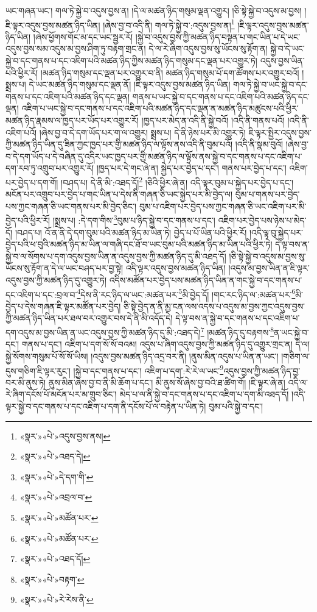 ཡང་གཞན་ཡང་། གལ་ཏེ་སྐྱེ་བ་འདུས་བྱས་ན། །དེ་ལ་མཚན་ཉིད་གསུམ་ལྡན་འགྱུར། །ཅི་སྟེ་སྐྱེ་བ་འདུས་མ་བྱས། །ཇི་ལྟར་འདུས་བྱས་མཚན་ཉིད་ཡིན། །ཞེས་བྱ་བ་འདི་ནི། གལ་ཏེ་སྐྱེ་བ་:འདུས་བྱས་ན།\footnote{«སྣར་»«པེ་»འདུས་བྱས་ནས།} །ཇི་ལྟར་འདུས་བྱས་མཚན་ཉིད་ཡིན། །ཞེས་ཕྱོགས་གོང་མ་དང་ཡང་སྦྱར་རོ། །སྐྱེ་བ་འདུས་བྱས་ཀྱི་མཚན་ཉིད་བསྟན་པ་གང་ཡིན་པ་དེ་ཡང་འདུས་བྱས་སམ་འདུས་མ་བྱས་ཤིག་ཏུ་བརྟག་གྲང་ན། དེ་ལ་རེ་ཞིག་འདུས་བྱས་སུ་ཡོངས་སུ་རྟོག་ན། སྐྱེ་བ་དེ་ཡང་སྐྱེ་བ་དང་གནས་པ་དང་འཇིག་པའི་མཚན་ཉིད་ཀྱིས་མཚན་ཉིད་གསུམ་དང་ལྡན་པར་འགྱུར་ཏེ། འདུས་བྱས་ཡིན་པའི་ཕྱིར་རོ། །མཚན་ཉིད་གསུམ་དང་ལྡན་པར་འགྱུར་བ་ནི། མཚན་ཉིད་གསུམ་པོ་དག་ཚོགས་པར་འགྱུར་བའོ། །སྨྲས་པ། དེ་ཡང་མཚན་ཉིད་གསུམ་དང་ལྡན་ནོ། །ཇི་ལྟར་འདུས་བྱས་མཚན་ཉིད་ཡིན། གལ་ཏེ་སྐྱེ་བ་ཡང་སྐྱེ་བ་དང་གནས་པ་དང་འཇིག་པའི་མཚན་ཉིད་དང་ལྡན། གནས་པ་ཡང་སྐྱེ་བ་དང་གནས་པ་དང་འཇིག་པའི་མཚན་ཉིད་དང་ལྡན། འཇིག་པ་ཡང་སྐྱེ་བ་དང་གནས་པ་དང་འཇིག་པའི་མཚན་ཉིད་དང་ལྡན་ན་མཚན་ཉིད་མཚུངས་པའི་ཕྱིར་མཚན་ཉིད་རྣམས་ལ་ཁྱད་པར་ཡོད་པར་འགྱུར་རོ། །ཁྱད་པར་མེད་ན་འདི་ནི་སྐྱེ་བའོ། །འདི་ནི་གནས་པའོ། །འདི་ནི་འཇིག་པའོ། །ཞེས་བྱ་བ་དེ་དག་ཡོད་པར་ག་ལ་འགྱུར། སྨྲས་པ། དེ་ནི་ཉེས་པར་མི་འགྱུར་ཏེ། ཇི་ལྟར་སྤྱིར་འདུས་བྱས་ཀྱི་མཚན་ཉིད་ཡིན་དུ་ཟིན་ཀྱང་ཁྱད་པར་གྱི་མཚན་ཉིད་ལ་ལྟོས་ནས་འདི་ནི་བུམ་པའོ། །འདི་ནི་སྣམ་བུའོ། །ཞེས་བྱ་བ་དེ་དག་ཡོད་པ་དེ་བཞིན་དུ་འདིར་ཡང་ཁྱད་པར་གྱི་མཚན་ཉིད་ལ་ལྟོས་ནས་སྐྱེ་བ་དང་གནས་པ་དང་འཇིག་པ་དག་རབ་ཏུ་འགྲུབ་པར་འགྱུར་རོ། །ཁྱད་པར་དེ་གང་ཞེ་ན། སྐྱེད་པར་བྱེད་པ་དང་། གནས་པར་བྱེད་པ་དང་། འཇིག་པར་བྱེད་པ་དག་གོ། །བཤད་པ། དེ་ནི་མི་:འཐད་དོ།\footnote{«སྣར་»«པེ་»འཐད་དེ།} །ཅིའི་ཕྱིར་ཞེ་ན། འདི་ལྟར་བུམ་པ་སྐྱེད་པར་བྱེད་པ་དང་། མངོན་པར་འགྲུབ་པར་བྱེད་པ་གང་ཡིན་པ་དེས་ནི་གཞན་ཅི་ཡང་སྐྱེད་པར་མི་བྱེད་ལ། བུམ་པ་གནས་པར་བྱེད་པས་ཀྱང་གཞན་ཅི་ཡང་གནས་པར་མི་བྱེད་ཅིང་། བུམ་པ་འཇིག་པར་བྱེད་པས་ཀྱང་གཞན་ཅི་ཡང་འཇིག་པར་མི་བྱེད་པའི་ཕྱིར་རོ། །སྨྲས་པ། :དེ་དག་གིས་\footnote{«སྣར་»«པེ་»དེ་དག་གི་}བུམ་པ་ཉིད་སྐྱེ་བ་དང་གནས་པ་དང་། འཇིག་པར་བྱེད་པས་ཉེས་པ་མེད་དོ། །བཤད་པ། འོ་ན་ནི་དེ་དག་བུམ་པའི་མཚན་ཉིད་མ་ཡིན་ཏེ། བྱེད་པ་པོ་ཡིན་པའི་ཕྱིར་རོ། །འདི་ལྟ་བུ་སྐྱེད་པར་བྱེད་པའི་ཕ་བུའི་མཚན་ཉིད་མ་ཡིན་ལ་གཞི་དང་ཐོ་བ་ཡང་བུམ་པའི་མཚན་ཉིད་མ་ཡིན་པའི་ཕྱིར་ཏེ། དེ་ལྟ་བས་ན་སྐྱེ་བ་ལ་སོགས་པ་དག་འདུས་བྱས་ཡིན་ན་འདུས་བྱས་ཀྱི་མཚན་ཉིད་དུ་མི་འཐད་དོ། །ཅི་སྟེ་སྐྱེ་བ་འདུས་མ་བྱས་སུ་ཡོངས་སུ་རྟོག་ན་དེ་ལ་ཡང་བཤད་པར་བྱ་སྟེ། འདི་ལྟར་འདུས་བྱས་མཚན་ཉིད་ཡིན། །འདུས་མ་བྱས་ཡིན་ན་ཇི་ལྟར་འདུས་བྱས་ཀྱི་མཚན་ཉིད་དུ་འགྱུར་ཏེ། འདིས་མཚོན་པར་བྱེད་པས་མཚན་ཉིད་ཡིན་ན་གང་སྐྱེ་བ་དང་གནས་པ་དང་འཇིག་པ་དང་:བྲལ་བ་\footnote{«སྣར་»«པེ་»འབྲལ་བ་}དེས་ནི་རང་ཉིད་ལ་ཡང་:མཚན་པར་\footnote{«སྣར་»«པེ་»མཚོན་པར་}མི་བྱེད་དོ། །གང་རང་ཉིད་ལ་:མཚན་པར་\footnote{«སྣར་»«པེ་»མཚོན་པར་}མི་བྱེད་པ་དེས་གཞན་ཇི་ལྟར་མཚོན་པར་བྱེད། ཅི་སྟེ་བྱེད་ན་ནི་མྱ་ངན་ལས་འདས་པ་འདུས་མ་བྱས་ཀྱང་འདུས་བྱས་ཀྱི་མཚན་ཉིད་ཡིན་པར་ཐལ་བར་འགྱུར་བས་དེ་ནི་མི་འདོད་དེ། དེ་ལྟ་བས་ན་སྐྱེ་བ་དང་གནས་པ་དང་འཇིག་པ་དག་འདུས་མ་བྱས་ཡིན་ན་ཡང་འདུས་བྱས་ཀྱི་མཚན་ཉིད་དུ་མི་:འཐད་དེ།\footnote{«སྣར་»«པེ་»འཐད་དོ།} །མཚན་ཉིད་དུ་བརྟགས་\footnote{«སྣར་»«པེ་»བརྟག་}ན་ཡང་སྐྱེ་བ་དང་། གནས་པ་དང་། འཇིག་པ་དག་སོ་སོ་བའམ། འདུས་པ་ཞིག་འདུས་བྱས་ཀྱི་མཚན་ཉིད་དུ་འགྱུར་གྲང་ན། དེ་ལ། སྐྱེ་སོགས་གསུམ་པོ་སོ་སོ་ཡིས། །འདུས་བྱས་མཚན་ཉིད་འདྲ་བར་ནི། །ནུས་མིན་འདུས་པ་ཡིན་ན་ཡང་། །གཅིག་ལ་དུས་གཅིག་ཇི་ལྟར་རུང་། །སྐྱེ་བ་དང་གནས་པ་དང་། འཇིག་པ་དག་:རེ་རེ་ལ་ཡང་\footnote{«སྣར་»«པེ་»རེ་རེས་ནི་}འདུས་བྱས་ཀྱི་མཚན་ཉིད་བྱ་བར་མི་ནུས་ཏེ། ནུས་མིན་ཞེས་བྱ་བ་ནི་མི་ཆོག་པ་དང་། མི་ནུས་སོ་ཞེས་བྱ་བའི་ཐ་ཚིག་གོ། །ཇི་ལྟར་ཞེ་ན། འདི་ལ་རེ་ཞིག་དངོས་པོ་མངོན་པར་མ་གྲུབ་ཅིང་། མེད་པ་ལ་ནི་སྐྱེ་བ་དང་གནས་པ་དང་འཇིག་པ་དག་མི་འཐད་དོ། །འདི་ལྟར་སྐྱེ་བ་དང་གནས་པ་དང་འཇིག་པ་དག་ནི་དངོས་པོ་ལ་བརྟེན་པ་ཡིན་ཏེ། བུམ་པའི་སྐྱེ་བ་དང་། 